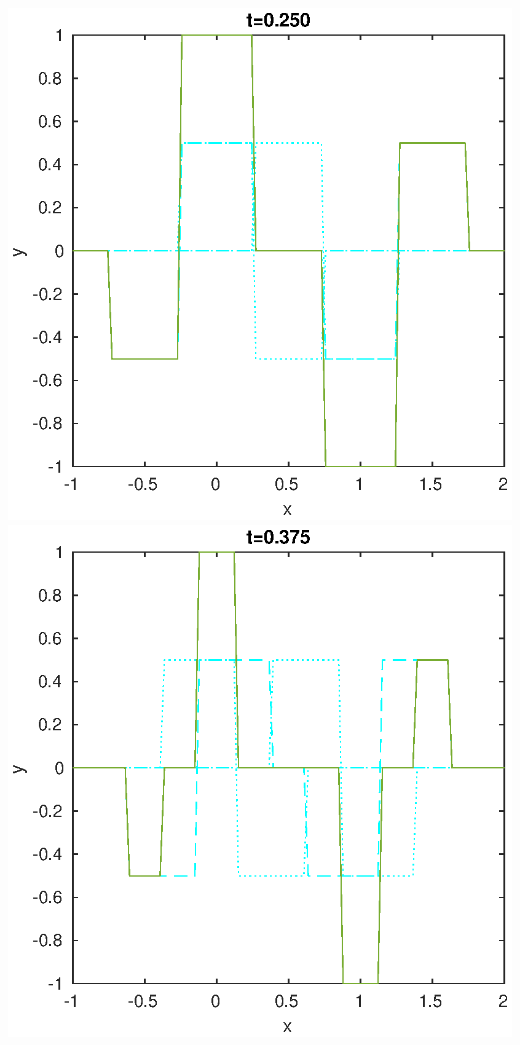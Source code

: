 \documentclass{jreport}
\begin{document}
\includegraphics[scale=0.3]{225.eps}
\includegraphics[scale=0.3]{2375.eps}
\end{document}
